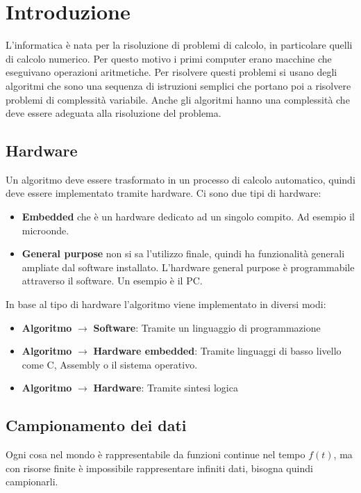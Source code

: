 \documentclass[a4paper]{article}
\theoremstyle{break}
\theoremstyle{break}
\theoremstyle{break}
\theoremstyle{break}
\begin{document}


\tableofcontents
\pagebreak
\section{Introduzione}
L'informatica è nata per la risoluzione di problemi di calcolo, in particolare
quelli di calcolo numerico. Per questo motivo i primi computer erano macchine
che eseguivano operazioni aritmetiche. Per risolvere questi problemi si usano
degli algoritmi che sono una sequenza di istruzioni semplici che portano poi
a risolvere problemi di complessità variabile. Anche gli algoritmi hanno una
complessità che deve essere adeguata alla risoluzione del problema.

\subsection{Hardware}
Un algoritmo deve essere trasformato in un processo di calcolo automatico,
quindi deve essere implementato tramite hardware. Ci sono due tipi di hardware:
\begin{itemize}
	\item \textbf{Embedded} che è un hardware dedicato ad un singolo compito.
	      Ad esempio il microonde.
	\item \textbf{General purpose} non si sa l'utilizzo finale, quindi ha
	      funzionalità generali ampliate dal software installato. L'hardware
	      general purpose è programmabile attraverso il software. Un esempio
	      è il PC.
\end{itemize}

In base al tipo di hardware l'algoritmo viene implementato in diversi modi:
\begin{itemize}
	\item \textbf{Algoritmo} \( \to  \) \textbf{Software}: Tramite un linguaggio di programmazione
	\item \textbf{Algoritmo} \( \to  \)  \textbf{Hardware embedded}: Tramite linguaggi di basso livello
	      come C, Assembly o il sistema operativo.
	\item \textbf{Algoritmo} \( \to  \)  \textbf{Hardware}: Tramite sintesi logica
\end{itemize}

\subsection{Campionamento dei dati}
Ogni cosa nel mondo è rappresentabile da funzioni continue nel tempo \( f(t) \),
ma con risorse finite è impossibile rappresentare infiniti dati, bisogna quindi
campionarli.
\end{document}
